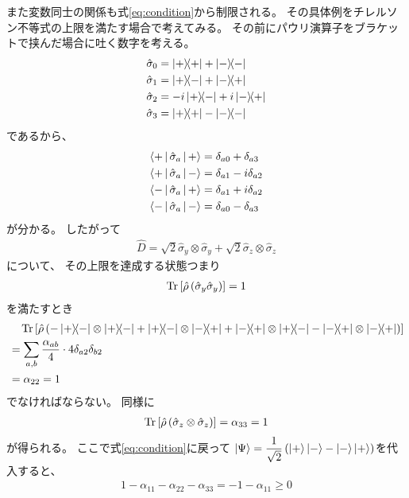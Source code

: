 \documentclass[a4paper, 10pt]{jsarticle}
\begin{document}
また変数同士の関係も式\eqref{eq:condition}から制限される。
その具体例をチレルソン不等式の上限を満たす場合で考えてみる。
その前にパウリ演算子をブラケットで挟んだ場合に吐く数字を考える。
\begin{align}
	\hat{\sigma}_0 &= \Ketbra{+}{+} + \Ketbra{-}{-} \\
	\hat{\sigma}_1 &= \Ketbra{+}{-} + \Ketbra{-}{+} \\
	\hat{\sigma}_2 &= -i \Ketbra{+}{-} + i \Ketbra{-}{+} \\
	\hat{\sigma}_3 &= \Ketbra{+}{+} - \Ketbra{-}{-}
\end{align}
であるから、
\begin{align}
	\Braket{+ | \hat{\sigma}_a | +} &= \delta_{a0} + \delta_{a3} \\
	\Braket{+ | \hat{\sigma}_a | -} &= \delta_{a1} -i \delta_{a2} \\
	\Braket{- | \hat{\sigma}_a | +} &= \delta_{a1} + i \delta_{a2} \\
	\Braket{- | \hat{\sigma}_a | -} &= \delta_{a0} - \delta_{a3}
\end{align}
が分かる。
したがって
\begin{align}
	\hat{D} = \sqrt{2} \hat{\sigma}_y \otimes \hat{\sigma}_y
	+ \sqrt{2} \hat{\sigma}_z \otimes \hat{\sigma}_z
\end{align}
について、
その上限を達成する状態つまり
\begin{align}
	\operatorname*{Tr} \left[ \hat{\rho} \left( \hat{\sigma}_y \hat{\sigma}_y \right) \right]
	= 1
\end{align}
を満たすとき
\begin{align}
	&\quad \Tr \left[ \hat{\rho} \left( -\Ketbra{+}{-} \otimes \Ketbra{+}{-}
	+ \Ketbra{+}{-} \otimes \Ketbra{-}{+}
	+ \Ketbra{-}{+} \otimes \Ketbra{+}{-}
	- \Ketbra{-}{+} \otimes \Ketbra{-}{+} \right) \right] \\
	&=\sum_{a,b} \frac{\alpha_{ab}}{4} \cdot 4\delta_{a2} \delta_{b2} \\
	&= \alpha_{22}
	= 1
\end{align}
でなければならない。
同様に
\begin{align}
	\operatorname*{Tr} \left[ \hat{\rho}
	\left( \hat{\sigma}_z \otimes \hat{\sigma}_z \right) \right]
	= \alpha_{33}
	= 1
\end{align}
が得られる。
ここで式\eqref{eq:condition}に戻って
$\displaystyle \Ket{\Psi} = \frac{1}{\sqrt{2}} \left( \Ket{+} \Ket{-}
- \Ket{-}\Ket{+} \right)$を代入すると、
\begin{align}
	1 - \alpha_{11} - \alpha_{22} - \alpha_{33}
	= -1 - \alpha_{11} \geq 0
\end{align}
\end{document}
